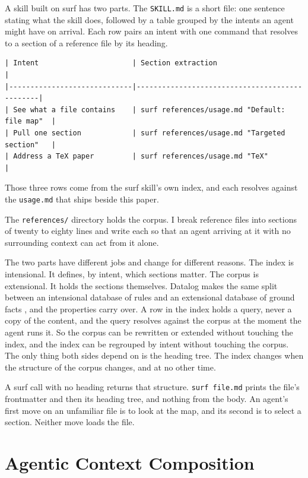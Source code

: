 \documentclass[11pt]{article}
\begin{document}
A skill built on surf has two parts. The \texttt{SKILL.md} is a short file: one
sentence stating what the skill does, followed by a table grouped by the intents
an agent might have on arrival. Each row pairs an intent with one command that
resolves to a section of a reference file by its heading.

\begin{Verbatim}
| Intent                      | Section extraction                            |
|-----------------------------|-----------------------------------------------|
| See what a file contains    | surf references/usage.md "Default: file map"  |
| Pull one section            | surf references/usage.md "Targeted section"   |
| Address a TeX paper         | surf references/usage.md "TeX"                |
\end{Verbatim}

Those three rows come from the surf skill's own index, and each resolves
against the \texttt{usage.md} that ships beside this paper.

The \texttt{references/} directory holds the corpus. I break reference files
into sections of twenty to eighty lines and write each so that an agent arriving
at it with no surrounding context can act from it alone.

The two parts have different jobs and change for different reasons. The index
is intensional. It defines, by intent, which sections matter. The corpus is
extensional. It holds the sections themselves. Datalog makes the same split
between an intensional database of rules and an extensional database of ground
facts \cite{ceri1989}, and the properties carry over. A row in the index holds a
query, never a copy of the content, and the query resolves against the corpus at
the moment the agent runs it. So the corpus can be rewritten or extended without
touching the index, and the index can be regrouped by intent without touching
the corpus. The only thing both sides depend on is the heading tree. The index
changes when the structure of the corpus changes, and at no other time.

A surf call with no heading returns that structure. \texttt{surf file.md}
prints the file's frontmatter and then its heading tree, and nothing from the
body. An agent's first move on an unfamiliar file is to look at the map, and its
second is to select a section. Neither move loads the file.

\section{Agentic Context Composition}
\end{document}

